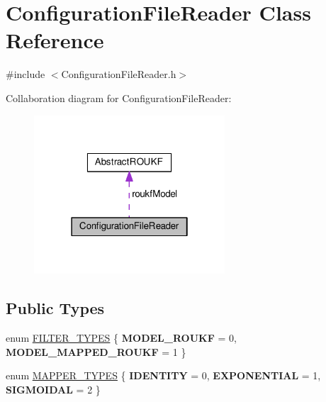 \hypertarget{classConfigurationFileReader}{}\section{Configuration\+File\+Reader Class Reference}
\label{classConfigurationFileReader}


{\ttfamily \#include $<$Configuration\+File\+Reader.\+h$>$}



Collaboration diagram for Configuration\+File\+Reader\+:\nopagebreak
\begin{figure}[H]
\begin{center}
\leavevmode
\includegraphics[width=202pt]{classConfigurationFileReader__coll__graph}
\end{center}
\end{figure}
\subsection*{Public Types}
\begin{DoxyCompactItemize}
\item 
enum \mbox{\hyperlink{classConfigurationFileReader_a38105d1480e7e412757a48b9f5d1850a}{F\+I\+L\+T\+E\+R\+\_\+\+T\+Y\+P\+ES}} \{ {\bfseries M\+O\+D\+E\+L\+\_\+\+R\+O\+U\+KF} = 0, 
{\bfseries M\+O\+D\+E\+L\+\_\+\+M\+A\+P\+P\+E\+D\+\_\+\+R\+O\+U\+KF} = 1
 \}
\item 
enum \mbox{\hyperlink{classConfigurationFileReader_adfafe1ca108e6cdb42c3cda28f76628d}{M\+A\+P\+P\+E\+R\+\_\+\+T\+Y\+P\+ES}} \{ {\bfseries I\+D\+E\+N\+T\+I\+TY} = 0, 
{\bfseries E\+X\+P\+O\+N\+E\+N\+T\+I\+AL} = 1, 
{\bfseries S\+I\+G\+M\+O\+I\+D\+AL} = 2
 \}
\end{DoxyCompactItemize}

